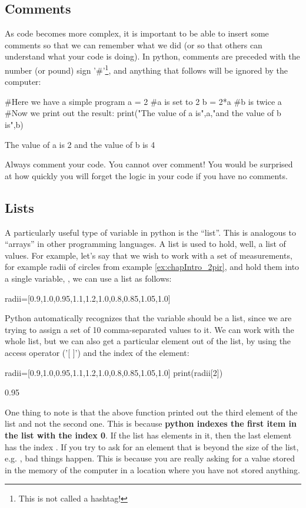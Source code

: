 \subsection{Comments}
As code becomes more complex, it is important to be able to insert some comments so that we can remember what we did (or so that others can understand what your code is doing). In python, comments are preceded with the number (or pound) sign '\#'\footnote{This is not called a hashtag!}, and anything that follows will be ignored by the computer:
\begin{python}[caption=Using comments]
#Here we have a simple program 
a = 2 #a is set to 2
b = 2*a #b is twice a
#Now we print out the result:
print("The value of a is",a,"and the value of b is",b)
\end{python}
\begin{poutput}
The value of a is 2 and the value of b is 4
\end{poutput}
Always comment your code. You cannot over comment! You would be surprised at how quickly you will forget the logic in your code if you have no comments.
\subsection{Lists}
A particularly useful type of variable in python is the ``list''. This is analogous to ``arrays'' in other programming languages. A list is used to hold, well, a list of values. For example, let's say that we wish to work with a set of measurements, for example radii of circles from example \ref{ex:chapIntro_2pir}, and hold them into a single variable, , we can use a list as follows:
\begin{python}[caption = Defining a list]
radii=[0.9,1.0,0.95,1.1,1.2,1.0,0.8,0.85,1.05,1.0]
\end{python}
Python automatically recognizes that the variable  should be a list, since we are trying to assign a set of 10 comma-separated values to it. We can work with the whole list, but we can also get a particular element out of the list, by using the access operator ('{[ ]}') and the index of the element:
\begin{python}[caption = Indexing a list]
radii=[0.9,1.0,0.95,1.1,1.2,1.0,0.8,0.85,1.05,1.0]
print(radii[2])
\end{python}
\begin{poutput}
0.95
\end{poutput}
One thing to note is that the above  function printed out the third element of the list and not the second one. This is because \textbf{python indexes the first item in the list with the index 0}. If the list has  elements in it, then the last element has the index . If you try to ask for an element that is beyond the size of the list, e.g. , bad things happen. This is because you are really asking for a value stored in the memory of the computer in a location where you have not stored anything. 

